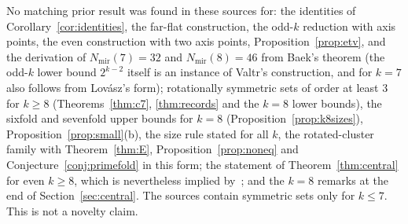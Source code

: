 \documentclass[10pt]{article}
\theoremstyle{definition}
\theoremstyle{remark}
\newcommand{\Nm}{N_{\mathrm{mir}}}
\begin{document}
No matching prior result was found in these sources for: the identities of Corollary~\ref{cor:identities}, the far-flat
construction, the odd-$k$ reduction with axis points, the even construction with two axis points,
Proposition~\ref{prop:etv}, and the derivation of $\Nm(7)=32$ and $\Nm(8)=46$ from Baek's theorem (the odd-$k$ lower
bound $2^{k-2}$ itself is an instance of Valtr's construction, and for $k=7$ also follows from Lov\'asz's form); rotationally symmetric sets of order at least $3$ for
$k\ge8$ (Theorems~\ref{thm:c7}, \ref{thm:records} and the $k=8$ lower bounds), the sixfold and sevenfold upper bounds for
$k=8$ (Proposition~\ref{prop:k8sizes}), Proposition~\ref{prop:small}(b), the size rule
stated for all $k$, the rotated-cluster family with Theorem~\ref{thm:E}, Proposition~\ref{prop:noneq} and
Conjecture~\ref{conj:primefold} in this form; the statement of Theorem~\ref{thm:central} for even $k\ge8$, which is
nevertheless implied by~\cite{BB25,SMQH25}; and the $k=8$ remarks at the end of Section~\ref{sec:central}. The sources
contain symmetric sets only for $k\le7$. This is not a novelty claim.
\end{document}
